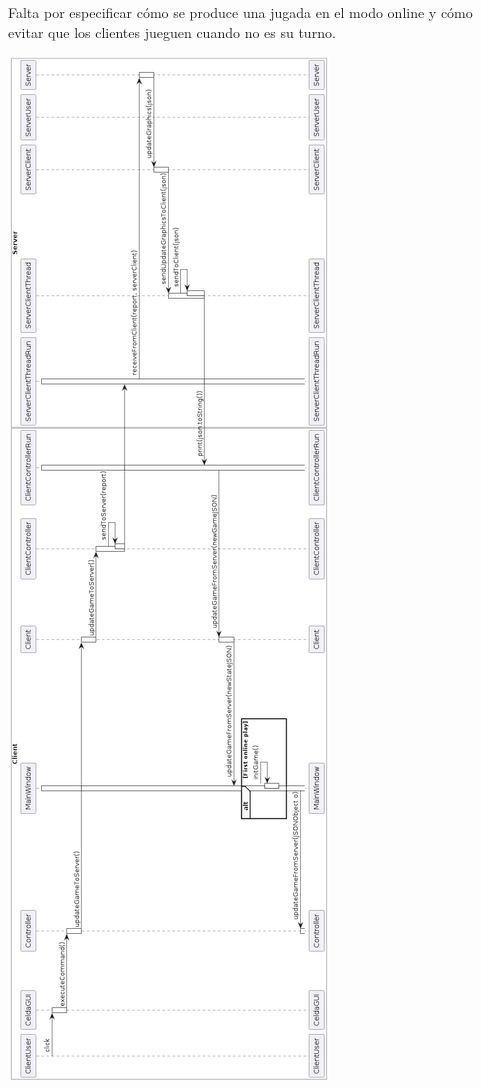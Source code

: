 \documentclass[../DocumentoOficial.tex]{subfiles}
\begin{document}
Falta por especificar cómo se produce una jugada en el modo online y cómo evitar que los clientes jueguen cuando no es su turno.

\begin{center}
\includegraphics[scale=0.4]{juegoTipicoUmlSprint7.png}
\end{center}
\end{document}
